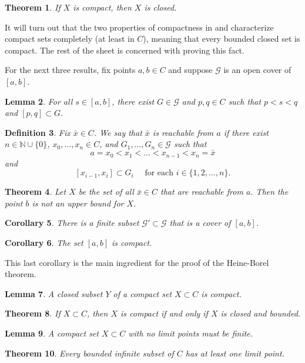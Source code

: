 \documentclass{amsart}
\newtheorem{theorem}{Theorem}
\newtheorem{lemma}[theorem]{Lemma}
\newtheorem{definition}[theorem]{Definition}
\newtheorem{corollary}[theorem]{Corollary}
\newcommand{\N}{\mathbb N}
\newcommand{\1}{\mathds{1}}
\def \N {{\mathbb {N}}}
\numberwithin{equation}{section}
\numberwithin{theorem}{section}
\begin{document}
\begin{theorem} \label{compactimpliesclosed} If $X$ is compact, then $X$ is closed.
\end{theorem}

It will turn out that the two properties of compactness in  and  characterize compact sets completely (at least in $C$), meaning that every bounded closed set is compact.  The rest of the sheet is concerned with proving this fact.


\newcommand\cG{\mathcal G}

For the next three results, fix points $a,b\in C$ and suppose $\cG$ is an open cover of $[a,b]$.

\begin{lemma}
\label{lem2}
For all $s\in[a,b]$, there exist $G\in\cG$ and $p,q\in C$ such that $p<s<q$ and $[p,q]\subset G$.
\end{lemma}



\begin{definition}
	Fix $\bar x \in C$.  We say that $\bar x$ is \emph{reachable from $a$} if there exist $n\in\N\cup\{0\}$, $x_0,\ldots,x_n\in C$, and $G_1,\ldots,G_n\in\cG$ such that 
	\[
		a=x_0<x_1<\ldots<x_{n-1}<x_n=\bar x
	\]
	and
	\[
		[x_{i-1},x_i]\subset G_i
			\quad\text{ for each } i \in \{1,2,\dots, n\}.
	\]
\end{definition}



\begin{theorem}
Let $X$ be the set of all $\bar x\in C$ that are \emph{reachable from $a$}.  Then the point $b$ is not an upper bound for $X$.
%
\end{theorem}

\begin{corollary}
There is a finite subset $\cG'\subset\cG$ that is a cover of $[a,b]$.
\end{corollary}

\begin{corollary}
The set $[a, b]$ is compact.
\end{corollary}

This last corollary is the main ingredient for the proof of the Heine-Borel theorem.

\begin{lemma}
A closed subset $Y$ of a compact set $X \subset C$ is compact.
\end{lemma}

\begin{theorem} If $X \subset C$, then  $X$ is compact if and only if $X$ is closed and bounded.
\end{theorem}


\begin{lemma}
A compact set $X \subset C$ with no limit points must be finite.
\end{lemma}

\begin{theorem} Every bounded infinite subset of $C$ has at least one limit point.
\end{theorem}
\end{document}
